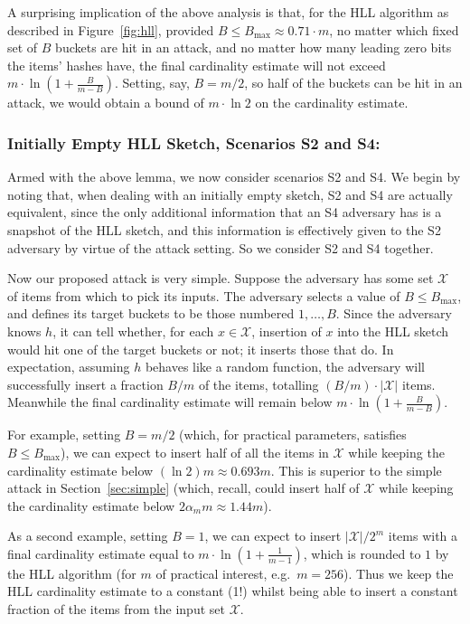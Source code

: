 \documentclass[sigconf, anonymous, dvipsnames]{acmart} %
\begin{document}
A surprising implication of the above analysis is that, for the HLL algorithm as described in Figure~\ref{fig:hll}, provided $B \leq B_{\max} \approx  0.71\cdot m$, no matter which fixed set of $B$ buckets are hit in an attack, and no matter how many leading zero bits the items' hashes have, the final cardinality estimate will not exceed $m \cdot \ln (1+\frac{B}{m-B})$. Setting, say, $B = m/2$, so half of the buckets can be hit in an attack, we would obtain a bound of $m \cdot \ln 2$ on the cardinality estimate.

\subsubsection{Initially Empty HLL Sketch, Scenarios S2 and S4:} 

Armed with the above lemma, we now consider scenarios S2 and S4. We begin by noting that, when dealing with an initially empty sketch, S2 and S4 are actually equivalent, since the only additional information that an S4 adversary has is a snapshot of the HLL sketch, and this information is effectively given to the S2 adversary by virtue of the attack setting. So we consider S2 and S4 together.

Now our proposed attack is very simple. Suppose the adversary has some set ${\mathcal{X}}$ of items from which to pick its inputs. The adversary selects a value of $B \leq B_{\max}$, and defines its target buckets to be those numbered $1,\ldots,B$. Since the adversary knows $h$, it can tell whether, for each $x \in {\mathcal{X}}$, insertion of $x$ into the HLL sketch would hit one of the target buckets or not; it inserts those that do. In expectation, assuming $h$ behaves like a random function, the adversary will successfully insert a fraction $B/m$ of the items, totalling $(B/m)\cdot |{\mathcal{X}}|$ items. Meanwhile the final cardinality estimate will remain below $m \cdot \ln (1+\frac{B}{m-B})$. 

For example, setting $B = m/2$ (which, for practical parameters, satisfies $B \leq B_{\max}$), we can expect to insert half of all the items in $\mathcal{X}$ while keeping the cardinality estimate below $(\ln 2)m \approx 0.693m$. This is superior to the simple attack in Section~\ref{sec:simple} (which, recall, could insert half of $\mathcal{X}$ while keeping the cardinality estimate below $2\alpha_m m \approx 1.44m$).

As a second example, setting $B = 1$, we can expect to insert $|{\mathcal{X}}|/2^m$ items with a final cardinality estimate equal to $m \cdot \ln (1+\frac{1}{m-1})$, which is rounded to $1$ by the HLL algorithm (for $m$ of practical interest, e.g.\ $m=256$). Thus we keep the HLL cardinality estimate to a constant (1!) whilst being able to insert a constant fraction of the items from the input set ${\mathcal{X}}$.
\end{document}
